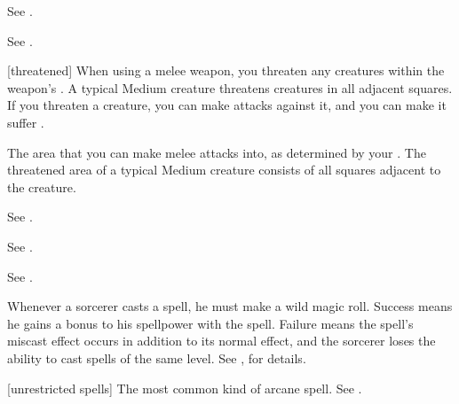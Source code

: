  See .

 See .

[threatened] When using a melee weapon, you threaten any creatures within the weapon's .
A typical Medium creature threatens creatures in all adjacent squares.
If you threaten a creature, you can make  attacks against it, and you can make it suffer .

 The area that you can make melee attacks into, as determined by your .
The threatened area of a typical Medium creature consists of all squares adjacent to the creature.

 See .

 See .

 See .

 Whenever a sorcerer casts a spell, he must make a wild magic roll.
Success means he gains a bonus to his spellpower with the spell.
Failure means the spell's miscast effect occurs in addition to its normal effect, and the sorcerer loses the ability to cast spells of the same level.
See , for details.

[unrestricted spells] The most common kind of arcane spell. See .
